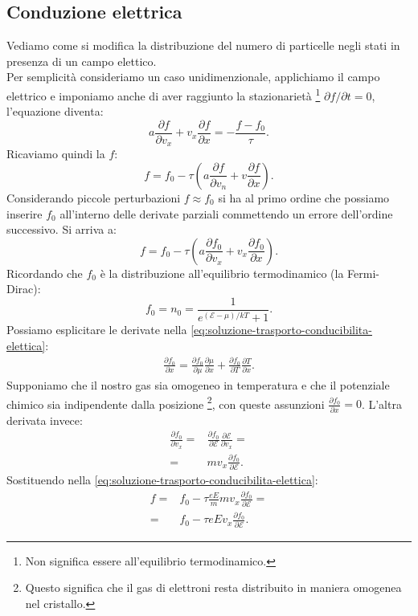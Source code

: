 \subsection{Conduzione elettrica}
\label{subsubsec:Conduzione elettrica}
Vediamo come si modifica la distribuzione del numero di particelle negli stati in presenza di un campo elettico.\\
Per semplicità consideriamo un caso unidimenzionale, applichiamo il campo elettrico e imponiamo anche di aver raggiunto la stazionarietà \footnote{Non significa essere all'equilibrio termodinamico.} $\partial f / \partial t = 0$, l'equazione diventa:
\[
	a \frac{\partial f}{\partial v_x} 
	+ v_x \frac{\partial f}{\partial x} 
	=
	- \frac{f-f_0}{\tau}
.\] 
Ricaviamo quindi la $f$:
\[
	f 
	=
	f_0 - \tau 
	\left( 
	a \frac{\partial f}{\partial v_n} 
	+ 
	v \frac{\partial f}{\partial x}  \right) 
.\]
Considerando piccole perturbazioni $f \approx f_0$ si ha al primo ordine che possiamo inserire $f_0$ all'interno delle derivate parziali commettendo un errore dell'ordine successivo. Si arriva a:
\[
	f 
	=
	f_0 
	- 
	\tau 
	\left( 
	a \frac{\partial f_0}{\partial v_x} 
	+ 
	v_x \frac{\partial f_0}{\partial x}  
	\right) \label{eq:soluzione-trasporto-conducibilita-elettica}
.\] 
Ricordando che $f_0$ è la distribuzione all'equilibrio termodinamico (la Fermi-Dirac):
\[
	f_0
	=
	n_0
	=
	\frac{1}{e^{\left( \mathcal{E} - \mu  \right) /kT}+1}
.\] 
Possiamo esplicitare le derivate nella \ref{eq:soluzione-trasporto-conducibilita-elettica}:
\[\begin{aligned}
	\frac{\partial f_0}{\partial x} 
	=
	\frac{\partial f_0}{\partial \mu } \frac{\partial \mu }{\partial x} 
	+
	\frac{\partial f_0}{\partial T} \frac{\partial T}{\partial x} 
	\label{eq:temperatura-non-omo}
.\end{aligned}\]
Supponiamo che il nostro gas sia omogeneo in temperatura e che il potenziale chimico sia indipendente dalla posizione \footnote{Questo significa che il gas di elettroni resta distribuito in maniera omogenea nel cristallo.}, con queste assunzioni $\frac{\partial f_0}{\partial x} = 0$. 
L'altra derivata invece:
\[\begin{aligned}
	\frac{\partial f_0}{\partial v_x} 
	=&
	\frac{\partial f_0}{\partial \mathcal{E} } 
	\frac{\partial \mathcal{E} }{\partial v_x} 
	= \\
	=& mv_x 
	\frac{\partial f_0}{\partial \mathcal{E} } 
.\end{aligned}\]
Sostituendo nella \ref{eq:soluzione-trasporto-conducibilita-elettica}:
\[\begin{aligned}
	f
	=&
	f_0
	-
	\tau \frac{eE}{m}
	mv_x \frac{\partial f_0}{\partial \mathcal{E} }
	=\\
	=& f_0
	-
	\tau e E v_x
	\frac{\partial f_0}{\partial \mathcal{E} } 
.\end{aligned}\]
